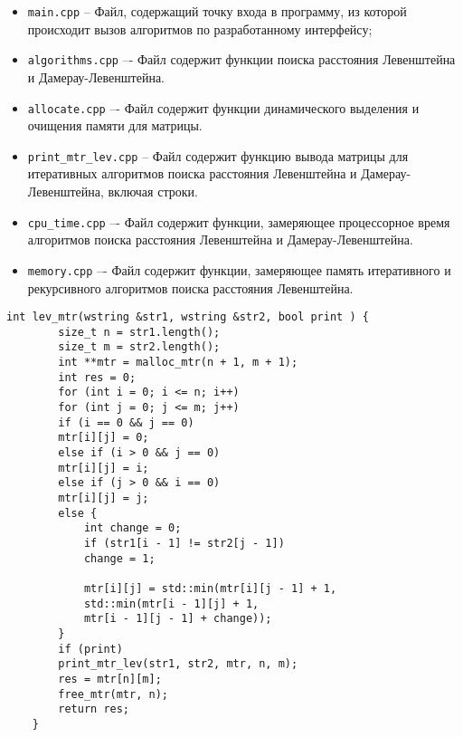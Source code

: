 \begin{itemize}
	\item \texttt{main.cpp} -- Файл, содержащий точку входа в программу, из которой происходит вызов алгоритмов по разработанному интерфейсу;
	\item \texttt{algorithms.cpp} –- Файл содержит функции поиска расстояния Левенштейна и Дамерау-Левенштейна.
	\item \texttt{allocate.cpp} –- Файл содержит функции динамического выделения и очищения памяти для матрицы.
	\item \texttt{print\_mtr\_lev.cpp} -- Файл содержит функцию вывода матрицы для итеративных алгоритмов поиска расстояния Левенштейна и Дамерау-Левенштейна, включая строки.
	\item \texttt{cpu\_time.cpp} –- Файл содержит функции, замеряющее процессорное время алгоритмов поиска расстояния Левенштейна и Дамерау-Левенштейна.
	\item \texttt{memory.cpp} –- Файл содержит функции, замеряющее память итеративного и рекурсивного алгоритмов поиска расстояния Левенштейна.
\end{itemize}

\clearpage

\begin{lstlisting}[label=lst:lev_mtr,caption=Функция нахождения расстояния Левенштейна с использованием матрицы]
	int lev_mtr(wstring &str1, wstring &str2, bool print ) {
		size_t n = str1.length();
		size_t m = str2.length();
		int **mtr = malloc_mtr(n + 1, m + 1);
		int res = 0;
		for (int i = 0; i <= n; i++)
		for (int j = 0; j <= m; j++)
		if (i == 0 && j == 0)
		mtr[i][j] = 0;
		else if (i > 0 && j == 0)
		mtr[i][j] = i;
		else if (j > 0 && i == 0)
		mtr[i][j] = j;
		else {
			int change = 0;
			if (str1[i - 1] != str2[j - 1])
			change = 1;
			
			mtr[i][j] = std::min(mtr[i][j - 1] + 1,
			std::min(mtr[i - 1][j] + 1,
			mtr[i - 1][j - 1] + change));
		}
		if (print)
		print_mtr_lev(str1, str2, mtr, n, m);
		res = mtr[n][m];
		free_mtr(mtr, n);
		return res;
	}
\end{lstlisting}

\clearpage

